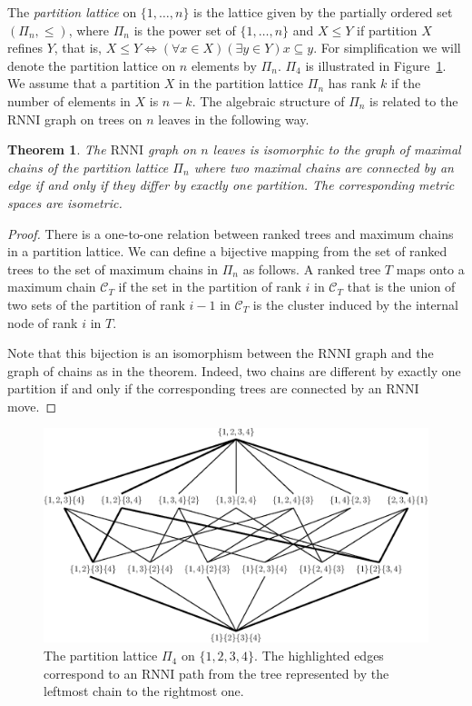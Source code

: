 \documentclass[11pt]{amsart}
\newtheorem{theorem}{Theorem}
\newcommand{\rnni}{\mathrm{RNNI}}
\begin{document}
The \emph{partition lattice} on $\{1, \ldots, n\}$ is the lattice given by the partially ordered set $(\Pi_n, \leq)$, where $\Pi_n$ is the power set of $\{1, \ldots, n\}$ and $X \leq Y$ if partition $X$ refines $Y$, that is, $X \leq Y \Leftrightarrow (\forall x \in X)(\exists y \in Y) x \subseteq y$.
For simplification we will denote the partition lattice on $n$ elements by $\Pi_n$.
$\Pi_4$ is illustrated in Figure~\ref{fig:partition_lattice4}.
We assume that a partition $X$ in the partition lattice $\Pi_n$ has rank $k$ if the number of elements in $X$ is $n-k$.
The algebraic structure of $\Pi_n$ is related to the $\rnni$ graph on trees on $n$ leaves in the following way.

\begin{theorem}
The $\rnni$ graph on $n$ leaves is isomorphic to the graph of maximal chains of the partition lattice $\Pi_n$ where two maximal chains are connected by an edge if and only if they differ by exactly one partition.
The corresponding metric spaces are isometric.
\label{thm:partition_lattice}
\end{theorem}

\begin{proof}
There is a one-to-one relation between ranked trees and maximum chains in a partition lattice.
We can define a bijective mapping from the set of ranked trees to the set of maximum chains in $\Pi_n$ as follows.
A ranked tree $T$ maps onto a maximum chain $\mathcal{C}_T$ if the set in the partition of rank $i$ in $\mathcal{C}_T$ that is the union of two sets of the partition of rank $i-1$ in $\mathcal{C}_T$ is the cluster induced by the internal node of rank $i$ in $T$.

Note that this bijection is an isomorphism between the $\rnni$ graph and the graph of chains as in the theorem.
Indeed, two chains are different by exactly one partition if and only if the corresponding trees are connected by an $\rnni$ move.
\end{proof}

\begin{figure}[H]
\centering
\includegraphics[width=\textwidth]{partition_lattice4}
\vspace{12pt}
\caption{The partition lattice $\Pi_4$ on $\{1,2,3,4\}$.
The highlighted edges correspond to an $\rnni$ path from the tree represented by the leftmost chain to the rightmost one.}
\label{fig:partition_lattice4}
\end{figure}
\end{document}
